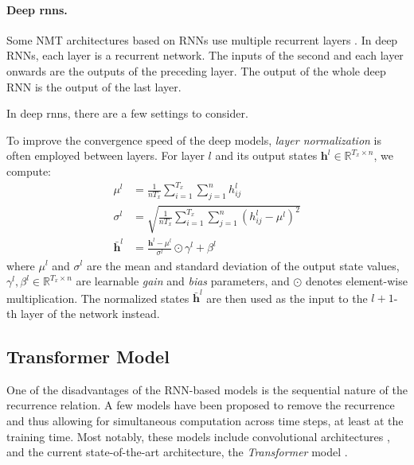 \paragraph{Deep \acp{rnn}.} Some NMT architectures based on RNNs use multiple
recurrent layers \citep{miceli-barone-etal-2017-deep,wu2016google}. In deep
RNNs, each layer is a recurrent network. The inputs of the second and each
layer onwards are the outputs of the preceding layer. The output of the whole
deep RNN is the output of the last layer.

In deep \acp{rnn}, there are a few settings to consider. 

  To improve the convergence
speed of the deep models, \emph{layer normalization} \citep{ba2016layer} is
often employed between layers. For layer $l$ and its output states
$\mathbf{h}^l \in \mathbb{R}^{T_x \times n}$, we compute:
%
\begin{align}
  \mu^l &= \frac{1}{nT_x} \sum_{i=1}^{T_x}\sum_{j=1}^n h^l_{ij} \\
  \sigma^l &= \sqrt{\frac{1}{nT_x} \sum_{i=1}^{T_x}\sum_{j=1}^n (h^l_{ij} - \mu^l)^2} \\
  \bar{\mathbf{h}}^l &= \frac{\mathbf{h}^l - \mu^l}{\sigma^l} \odot \gamma^l + \beta^l
\end{align}
%
where $\mu^l$ and $\sigma^l$ are the mean and standard deviation of the output
state values, $\gamma^l, \beta^l \in \mathbb{R}^{T_x \times n}$ are learnable
\emph{gain} and \emph{bias} parameters, and $\odot$ denotes element-wise
multiplication. The normalized states $\bar{\mathbf{h}}^l$ are then used as the
input to the $l+1$-th layer of the network instead. 




\subsection{Transformer Model}
\label{sec:encdec:transformer}

One of the disadvantages of the RNN-based models is the sequential nature of
the recurrence relation. A few models have been proposed to remove the
recurrence and thus allowing for simultaneous computation across time steps, at
least at the training time. Most notably, these models include convolutional
architectures \citep{gehring2017convolutional}, and the current
state-of-the-art architecture, the \emph{Transformer} model
\citep{vaswani2017attention}.

